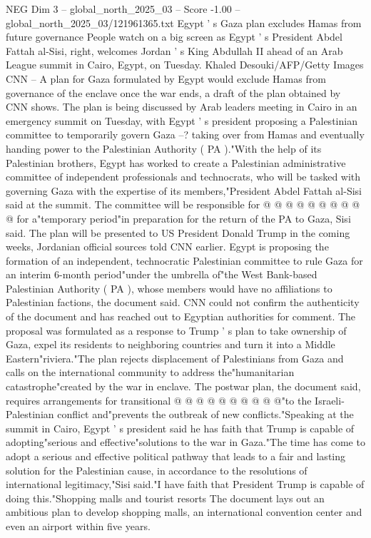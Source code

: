 \begin{textsample}{NEG Dim 3 – global\_north\_2025\_03 – Score -1.00 – global\_north\_2025\_03/121961365.txt}  \label{ex:f3_neg_434}
Egypt ' s Gaza plan excludes Hamas from future governance People watch on a big screen as Egypt ' s President Abdel Fattah al-Sisi, right, welcomes Jordan ' s King Abdullah II ahead of an Arab League summit in Cairo, Egypt, on Tuesday.
Khaled Desouki/AFP/Getty Images CNN -- A plan for Gaza formulated by Egypt would exclude Hamas from governance of the enclave once the war ends, a draft of the plan obtained by CNN shows.
The plan is being discussed by Arab leaders meeting in Cairo in an emergency summit on Tuesday, with Egypt ' s president proposing a Palestinian committee to temporarily govern Gaza --? taking over from Hamas and eventually handing power to the Palestinian Authority ( PA )."With the help of its Palestinian brothers, Egypt has worked to create a Palestinian administrative committee of independent professionals and technocrats, who will be tasked with governing Gaza with the expertise of its members,"President Abdel Fattah al-Sisi said at the summit.
The committee will be responsible for @ @ @ @ @ @ @ @ @ @ for a"temporary period"in preparation for the return of the PA to Gaza, Sisi said.
The plan will be presented to US President Donald Trump in the coming weeks, Jordanian official sources told CNN earlier.
Egypt is proposing the formation of an independent, technocratic Palestinian committee to rule Gaza for an interim 6-month period"under the umbrella of"the West Bank-based Palestinian Authority ( PA ), whose members would have no affiliations to Palestinian factions, the document said.
CNN could not confirm the authenticity of the document and has reached out to Egyptian authorities for comment.
The proposal was formulated as a response to Trump ' s plan to take ownership of Gaza, expel its residents to neighboring countries and turn it into a Middle Eastern"riviera."The plan rejects displacement of Palestinians from Gaza and calls on the international community to address the"humanitarian catastrophe"created by the war in enclave.
The postwar plan, the document said, requires arrangements for transitional @ @ @ @ @ @ @ @ @ @"to the Israeli-Palestinian conflict and"prevents the outbreak of new conflicts."Speaking at the summit in Cairo, Egypt ' s president said he has faith that Trump is capable of adopting"serious and effective"solutions to the war in Gaza."The time has come to adopt a serious and effective political pathway that leads to a fair and lasting solution for the Palestinian cause, in accordance to the resolutions of international legitimacy,"Sisi said."I have faith that President Trump is capable of doing this."Shopping malls and tourist resorts The document lays out an ambitious plan to develop shopping malls, an international convention center and even an airport within five years.

\end{textsample}
